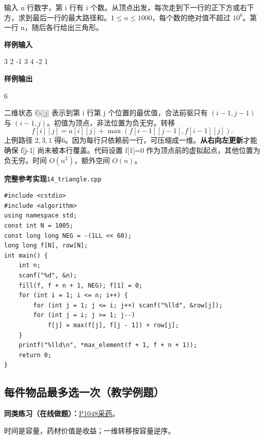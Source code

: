 \documentclass[UTF8,11pt,a4paper,fontset=none]{ctexart}
\newcommand{\practice}[2]{\par\noindent\textbf{同类练习（在线做题）：}\href{https://www.luogu.com.cn/problem/#1}{#1\quad #2}。\par}
\begin{document}
输入 n 行数字，第 i 行有 i 个数。从顶点出发，每次走到下一行的正下方或右下方，求到最后一行的最大路径和。$1\le n\le1000$，每个数的绝对值不超过 $10^6$。第一行 n，随后各行给出三角形。
\begin{tcolorbox}[samplebox,title={输入输出样例}]
\textbf{样例输入}
\begin{Sample}
3
2
-1 3
4 -2 1
\end{Sample}
\tcblower
\textbf{样例输出}
\begin{Sample}
6
\end{Sample}
\end{tcolorbox}
二维状态 f[i][j] 表示到第 i 行第 j 个位置的最优值，合法前驱只有 $(i-1,j-1)$ 与 $(i-1,j)$。初值为顶点，非法位置为负无穷。转移
\[f[i][j]=a[i][j]+\max(f[i-1][j-1],f[i-1][j]).\]
上例路径 $2,3,1$ 得6。因为每行只依赖前一行，可压缩成一维。\textbf{从右向左更新}才能确保 f[j-1] 尚未被本行覆盖。代码设置 f[1]=0 作为顶点前的虚拟起点，其他位置为负无穷。时间 $O(n^2)$，额外空间 $O(n)$。
\par\noindent\begin{minipage}{\linewidth}
\textbf{完整参考实现}\quad\texttt{14\_triangle.cpp}
\begin{lstlisting}
#include <cstdio>
#include <algorithm>
using namespace std;
const int N = 1005;
const long long NEG = -(1LL << 60);
long long f[N], row[N];
int main() {
    int n;
    scanf("%d", &n);
    fill(f, f + n + 1, NEG); f[1] = 0;
    for (int i = 1; i <= n; i++) {
        for (int j = 1; j <= i; j++) scanf("%lld", &row[j]);
        for (int j = i; j >= 1; j--)
            f[j] = max(f[j], f[j - 1]) + row[j];
    }
    printf("%lld\n", *max_element(f + 1, f + n + 1));
    return 0;
}
\end{lstlisting}
\end{minipage}\par

\subsection{每件物品最多选一次（教学例题）}

\practice{P1048}{采药}
时间是容量，药材价值是收益；一维转移按容量逆序。
\end{document}
